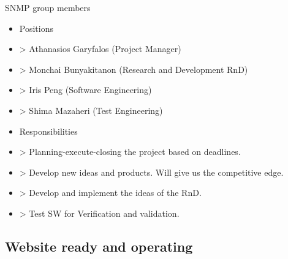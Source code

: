 \documentclass[xcolor=pdftex,dvipsnames,table]{beamer}
\begin{document}
\begin{frame}
  \begin{exampleblock}{SNMP group members}
    \begin{itemize}
      \item Positions
      \item<1-| alert@1>> Athanasios Garyfalos (\alert{Project Manager})
      \item<2-| alert@2>> Monchai Bunyakitanon (\alert{Research and Development RnD})
      \item<3-| alert@3>> Iris Peng (\alert{Software Engineering})
      \item<4-| alert@4>> Shima Mazaheri (\alert{Test Engineering})
      \item Responsibilities
      \item<1-| alert@1>> Planning-execute-closing the project based on deadlines.
      \item<2-| alert@2>> Develop new ideas and products. Will give us the competitive edge.
      \item<3-| alert@3>> Develop and implement the ideas of the RnD.
      \item<4-| alert@4>> Test SW for Verification and validation.
    \end{itemize}
  \end{exampleblock}
\end{frame}

\subsection{Website ready and operating}

\end{document}
